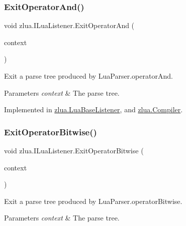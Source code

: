 \subsubsection{\texorpdfstring{Exit\+Operator\+And()}{ExitOperatorAnd()}}
{\footnotesize\ttfamily void zlua.\+I\+Lua\+Listener.\+Exit\+Operator\+And (\begin{DoxyParamCaption}\item[{\mbox{[}\+Not\+Null\mbox{]} \mbox{\hyperlink{classzlua_1_1_lua_parser_1_1_operator_and_context}{Lua\+Parser.\+Operator\+And\+Context}}}]{context }\end{DoxyParamCaption})}



Exit a parse tree produced by Lua\+Parser.\+operator\+And. 


\begin{DoxyParams}{Parameters}
{\em context} & The parse tree.\\
\hline
\end{DoxyParams}


Implemented in \mbox{\hyperlink{classzlua_1_1_lua_base_listener_ad0372c70a4c0b53a69f958e1d8c16065}{zlua.\+Lua\+Base\+Listener}}, and \mbox{\hyperlink{classzlua_1_1_compiler_a57e026e3b4f6ec40d78cc9f4c8068ad3}{zlua.\+Compiler}}.

\mbox{\label{interfacezlua_1_1_i_lua_listener_ab567120e6d7258b74d7f88c14d6cf3c3}} 
\subsubsection{\texorpdfstring{Exit\+Operator\+Bitwise()}{ExitOperatorBitwise()}}
{\footnotesize\ttfamily void zlua.\+I\+Lua\+Listener.\+Exit\+Operator\+Bitwise (\begin{DoxyParamCaption}\item[{\mbox{[}\+Not\+Null\mbox{]} \mbox{\hyperlink{classzlua_1_1_lua_parser_1_1_operator_bitwise_context}{Lua\+Parser.\+Operator\+Bitwise\+Context}}}]{context }\end{DoxyParamCaption})}



Exit a parse tree produced by Lua\+Parser.\+operator\+Bitwise. 


\begin{DoxyParams}{Parameters}
{\em context} & The parse tree.\\
\hline
\end{DoxyParams}


